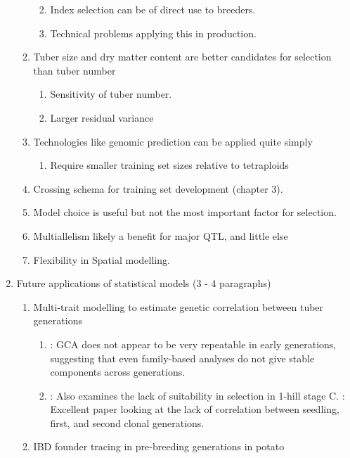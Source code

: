 \documentclass[
]{article}
\providecommand{\tightlist}{%
  \setlength{\itemsep}{0pt}\setlength{\parskip}{0pt}}\usepackage{longtable,booktabs,array}
\begin{document}
\begin{enumerate}
\begin{enumerate}
    \begin{enumerate}
    \def\labelenumiii{\Alph{enumiii}.}
    \tightlist
    \item
      Index selection can be of direct use to breeders.
    \item
      Technical problems applying this in production.
    \end{enumerate}
  \item
    Tuber size and dry matter content are better candidates for
    selection than tuber number

    \begin{enumerate}
    \def\labelenumiii{\Alph{enumiii}.}
    \tightlist
    \item
      Sensitivity of tuber number.
    \item
      Larger residual variance
    \end{enumerate}
  \item
    Technologies like genomic prediction can be applied quite simply

    \begin{enumerate}
    \def\labelenumiii{\Alph{enumiii}.}
    \tightlist
    \item
      Require smaller training set sizes relative to tetraploids
    \end{enumerate}
  \item
    Crossing schema for training set development (chapter 3).
  \item
    Model choice is useful but not the most important factor for
    selection.
  \item
    Multiallelism likely a benefit for major QTL, and little else
  \item
    Flexibility in Spatial modelling.
  \end{enumerate}
\item
  Future applications of statistical models (3 - 4 paragraphs)

  \begin{enumerate}
  \def\labelenumii{\roman{enumii})}
  \tightlist
  \item
    Multi-trait modelling to estimate genetic correlation between tuber
    generations

    \begin{enumerate}
    \def\labelenumiii{\Alph{enumiii}.}
    \tightlist
    \item
      \autocite{Gopal1998}: GCA does not appear to be very repeatable in
      early generations, suggesting that even family-based analyses do
      not give stable components across generations.
    \item
      \autocite{Davies1974}: Also examines the lack of suitability in
      selection in 1-hill stage C. \autocite{Maris1988}: Excellent paper
      looking at the lack of correlation between seedling, first, and
      second clonal generations.
    \end{enumerate}
  \item
    IBD founder tracing in pre-breeding generations in potato


\end{enumerate}
\end{enumerate}
\end{document}

